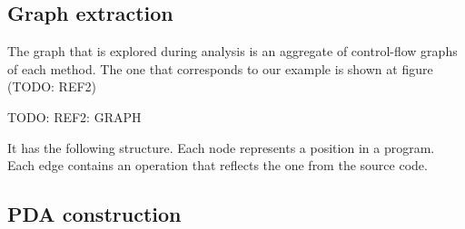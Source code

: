 \subsection{Graph extraction}

The graph that is explored during analysis is an aggregate of control-flow graphs of each method.
The one that corresponds to our example is shown at figure (TODO: REF2)

TODO: REF2: GRAPH

It has the following structure.
Each node represents a position in a program.
Each edge contains an operation that reflects the one from the source code.

\subsection{PDA construction}
